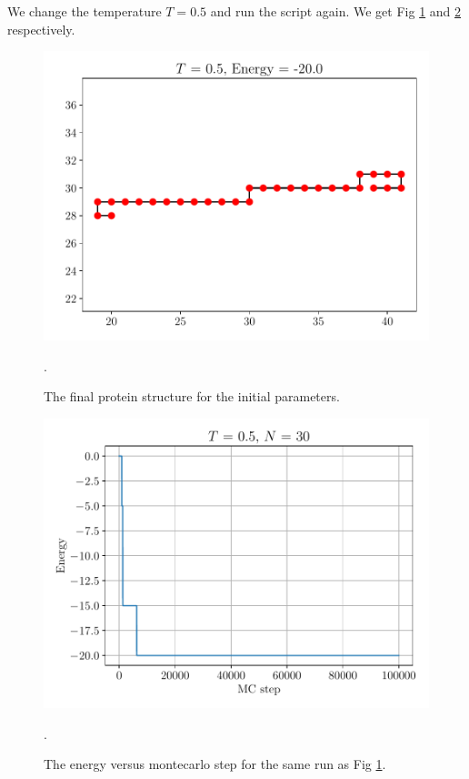 \documentclass{article}
\begin{document}
We change the temperature $T =0.5$ and run the script again. We get Fig \ref{fig:q3a_protein0.5} and \ref{fig:q3a_energy0.5} respectively. \\
\begin{figure}[h!]
    \centerline{\includegraphics[scale=0.6]{images/Q3a_final_protein_T5_N30_n100000.pdf}}
    \caption{The final protein structure for the initial parameters. }.
    \label{fig:q3a_protein0.5}
\end{figure}
\begin{figure}[h!]
    \centerline{\includegraphics[scale=0.6]{images/Q3a_energy_vs_step_T5_N30_n100000.pdf}}
    \caption{The energy versus montecarlo step for the same run as Fig \ref{fig:q3a_protein0.5}. }.
    \label{fig:q3a_energy0.5}
\end{figure}
\end{document}
